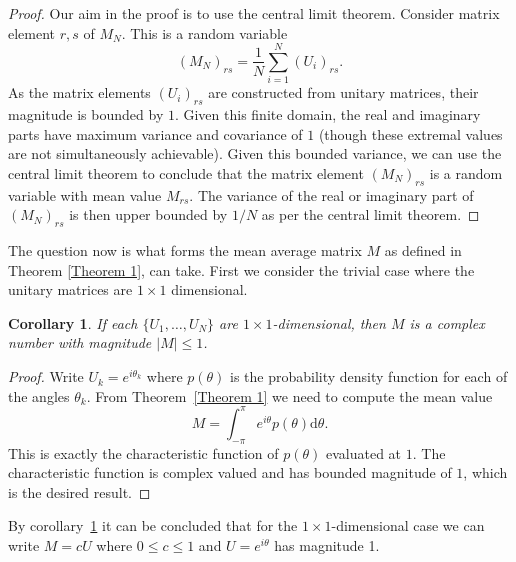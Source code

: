 \documentclass[aps,pra,twocolumn,superscriptaddress,numerical,floatfix]{revtex4-1}
\newtheorem{corollary}{Corollary}
\begin{document}
\begin{proof}\label{Proof 1}
Our aim in the proof is to use the central limit theorem.  Consider matrix element $r,s$ of $M_N$.  This is a random variable
\begin{equation}
	\left(M_N\right)_{rs} = \frac{1}{N} \sum_{i=1}^N \left(U_i\right)_{rs}.
\end{equation}
As the matrix elements $(U_i)_{rs}$ are constructed from unitary matrices, their magnitude is bounded by $1$.  Given this finite domain, the real and imaginary parts have maximum variance and covariance of $1$ (though these extremal values are not simultaneously achievable).  Given this bounded variance, we can use the central limit theorem to conclude that the matrix element $\left(M_N\right)_{rs}$ is a random variable with mean value $M_{rs}$.
The variance of the real or imaginary part of $(M_N)_{rs}$ is then upper bounded by $1/N$ as per the central limit theorem.
\end{proof}

The question now is what forms the mean average matrix $M$ as defined in Theorem \ref{Theorem 1}, can take. First we consider the trivial case where the unitary matrices are $1 \times 1$ dimensional.

\begin{corollary}
\label{Corollary 1}
	If each $\{U_1,\ldots,U_N\}$ are $1 \times 1$-dimensional, then $M$ is a complex number with magnitude $|M| \leq 1$.
\end{corollary}
\begin{proof}
	Write $U_k = e^{i \theta_k}$ where $p(\theta)$ is the probability density function for each of the angles $\theta_k$. From Theorem~\ref{Theorem 1} we need to compute the mean value 
	\begin{equation}
		M = \int^\pi_{-\pi} e^{i\theta} p(\theta) \mathrm{d}\theta. \label{eq:single parameter, single mode}
	\end{equation}
This is exactly the characteristic function of $p(\theta)$ evaluated at $1$.  The characteristic function is complex valued and has bounded magnitude of $1$, which is the desired result.
\end{proof}

By corollary~\ref{Corollary 1} it can be concluded that for the $1\times1$-dimensional case we can write $M=cU$ where $0 \leq c \leq 1$ and $U=e^{i\theta}$ has magnitude 1.  

\end{document}
